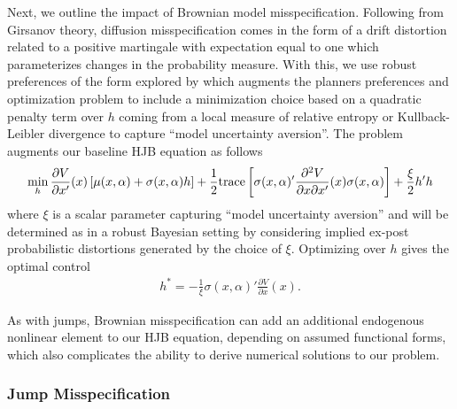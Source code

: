 \documentclass[12pt]{article}
\begin{document}
Next, we outline the impact of Brownian model misspecification. Following from Girsanov theory, diffusion misspecification comes in the form of a drift distortion related to a positive martingale with expectation equal to one which parameterizes changes in the probability measure. With this, we use robust preferences of the form explored by \cite{hansen2011robustness} which augments the planners preferences and optimization problem to include a minimization choice based on a quadratic penalty term over $h$ coming from a local measure of relative entropy or Kullback-Leibler divergence to capture ``model uncertainty aversion''. The problem augments our baseline HJB equation as follows
\begin{eqnarray*} \label{drift_distort} 
\min_{h} \frac{\partial V }{\partial x'}(x) \left[\mu(x,\alpha) + \sigma(x,\alpha) h \right] + \frac 1 2 {\rm trace}\left[\sigma(x,\alpha)' \frac{\partial^2 V }{\partial x \partial x'}(x)\sigma(x,\alpha)\right] + \frac{\xi}{2} h'h
\end{eqnarray*}
where $\xi$ is a scalar parameter capturing ``model uncertainty aversion'' and will be determined as in a robust Bayesian setting by considering implied ex-post probabilistic distortions generated by the choice of $\xi$. Optimizing over $h$ gives the optimal control 
\begin{eqnarray*} \label{drift_distort} 
h^* = - \frac 1 {\xi} \sigma(x,\alpha)'\frac{\partial V }{\partial x}(x).
\end{eqnarray*}

As with jumps, Brownian misspecification can add an additional endogenous nonlinear element to our HJB equation, depending on assumed functional forms, which also complicates the ability to derive numerical solutions to our problem.

\subsubsection{Jump Misspecification}
\end{document}
